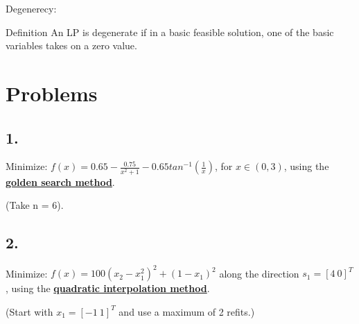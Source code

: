 \documentclass{article}
\begin{document}
\begin{customthm}{17}
  $ $
  
  Degenerecy:

  \qquad Definition An LP is degenerate if in a basic feasible solution, one of the basic variables takes on a zero value.

\end{customthm}
\newpage

\section*{Problems}

\subsection*{1.}

Minimize: $f(x) = 0.65 - \frac{0.75}{x^2 + 1} - 0.65tan^{-1}(\frac{1}{x})$, for $x \in (0,3)$, using the \textbf{\underline{golden search method}}. 

\quad (Take n = 6).
\newpage

\subsection*{2.}

Minimize: $f(x) = 100(x_2 - x_1^2)^2 + (1-x_1)^2$ along the direction $s_1 = [4 \ 0]^T$, using the \textbf{\underline{quadratic interpolation method}}.

\quad (Start with $x_1 = [-1 \ 1]^T$ and use a maximum of 2 refits.)
\end{document}
